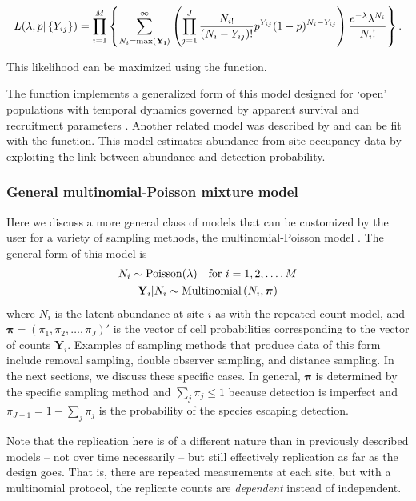 \documentclass[article,shortnames]{jss}
\DeclareMathOperator{\Poi}{Poisson}
\DeclareMathOperator{\MN}{Multinomial}
\begin{document}
\begin{equation}
L(\lambda, p | \left\{Y_{ij}\right\}) =
 \prod_{i=1}^{M}
 \left\{ \sum_{N_{i}=\max({\bf Y_i})}^{\infty}
          \left( \prod_{j=1}^{J}
     \frac{N_{i!}}{ (N_{i}-Y_{ij})!} p^{Y_{ij}}(1-p)^{N_{i}-Y_{ij}} \right)
       \frac{e^{-\lambda} \lambda^{N_i}}{N_i!} \right\}.
\end{equation}

This likelihood can be maximized using the  function.

The function  implements a generalized form of this model
designed for `open' populations with temporal dynamics governed by
apparent survival and recruitment parameters \citep{DailMadsen2011}. Another
related model was described by \citet{Royle2003} and can be fit with the
 function. This model estimates abundance from site occupancy
data by exploiting the link between abundance and detection probability.

\subsubsection{General multinomial-Poisson mixture model}

\label{sec:gener-mult-poiss}
Here we discuss a more general class of models that can be customized by the
user for a variety of sampling methods, the multinomial-Poisson model
\citep{Royle2004a}.   The general form of this model is
\begin{gather}
\label{eq:mp2}
  N_i \sim \Poi(\lambda) \text{\quad for $i=1,2,\dots,M$}  \notag \\
  \mathbf Y_i | N_{i} \sim \MN\left(N_i, \boldsymbol \pi \right) \notag
\end{gather}
where $N_i$ is the latent abundance at site $i$ as with the repeated
count model, and $\boldsymbol \pi=(\pi_1,\pi_2,\dots,\pi_J)'$ is
the vector of cell probabilities corresponding to the vector of counts
$\mathbf Y_{i}$.  Examples of sampling methods that produce data of
this form include removal sampling, double observer sampling,
and distance sampling. In the next sections, we discuss these specific
cases.  In general, $\boldsymbol \pi$ is
determined by the specific sampling method and
$\sum_{j} \pi_{j} \le 1$ because detection is imperfect and
$\pi_{J+1}=1 - \sum_{j} \pi_{j}$  is the probability of the species
escaping detection.

Note that the replication here is of a different
nature than in previously described models -- not over time necessarily --
but still effectively replication as far as the design goes. That is,
there are repeated measurements at each site, but with a multinomial protocol,
the replicate counts are {\it dependent} instead of independent.
\end{document}
